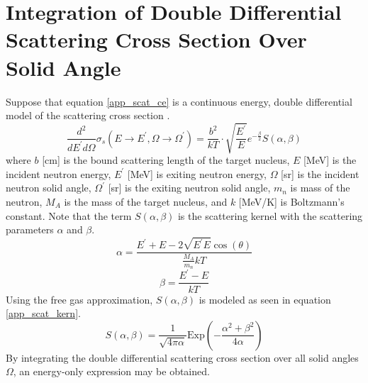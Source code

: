 \chapter{Integration of Double Differential Scattering Cross Section Over Solid Angle}
\label{appendix_integrate_solid_angle}

Suppose that equation \ref{app_scat_ce} is a continuous energy, double differential model of the scattering
cross section \cite{Yamamoto2006, Mattes2005}.
\begin{equation}
\label{app_scat_ce}
\frac{d^2}{dE^\prime d\Omega} \sigma_s(E\to E^\prime, \Omega\to\Omega^\prime) = \frac{b^2}{kT} \cdot
            \sqrt{\frac{E^{\prime}}{E}} e^{-\frac{\beta}{2}} S(\alpha, \beta)
\end{equation}
where $b$ [cm] is the bound scattering length of the target nucleus, $E$ [MeV] is the incident
neutron energy, $E^\prime$ [MeV] is exiting neutron energy, $\Omega$ [sr] is the incident
neutron solid angle, $\Omega^\prime$ [sr] is the exiting neutron solid angle,
$m_n$ is mass of the neutron,
$M_A$ is the mass of the target nucleus, and $k$ [MeV/K] is Boltzmann's constant.  Note that the term 
$S(\alpha, \beta)$ is the scattering kernel with the scattering parameters $\alpha$ and $\beta$.
\begin{equation}
\label{app_scat_alpha}
\alpha = \frac{E^\prime + E - 2\sqrt{E^\prime E}\cos(\theta)}{\frac{M_A}{m_n}kT}
\end{equation}
\begin{equation}
\label{app_scat_beta}
\beta = \frac{E^\prime - E}{kT}
\end{equation}
Using the free gas approximation, $S(\alpha, \beta)$ is modeled as seen in equation \ref{app_scat_kern}.
\begin{equation}
\label{app_scat_kern}
S(\alpha, \beta) = \frac{1}{\sqrt{4\pi\alpha}} \mbox{Exp}\left(-\frac{\alpha^2 + \beta^2}{4\alpha}\right)
\end{equation}
By integrating the double differential scattering cross section over all solid angles $\Omega$, 
an energy-only expression may be obtained.

